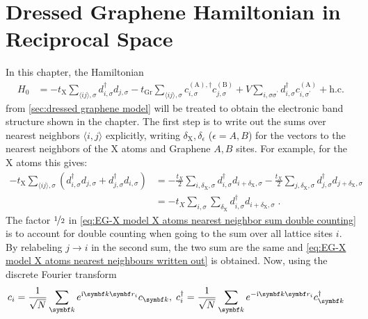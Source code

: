 \documentclass[../main.tex]{subfiles}
\begin{document}
\raggedbottom

\chapter{Dressed Graphene Hamiltonian in Reciprocal Space}\label{ch:dressed graphene reciprocal space}

In this chapter, the Hamiltonian
\begin{align}
	H_0 &= -t_{\mathrm{X}} \sum_{\langle ij \rangle, \sigma} d_{i, \sigma}^{\dagger} d_{j, \sigma}
	-t_{\mathrm{Gr}} \sum_{\langle ij \rangle, \sigma}
	c_{i, \sigma}^{(\mathrm{A}), \dagger} c_{j, \sigma}^{(\mathrm{B})}
	+ V \sum_{i, \sigma \sigma^{\prime}}
	d_{i, \sigma}^{\dagger} c_{i, \sigma^{\prime}}^{(\mathrm{A})} + \mathrm{h.c.}
	\label{eq:EG-X model Hamiltonian non-interacting appendix}
\end{align}
from \cref{sec:dressed graphene model} will be treated to obtain the electronic band structure shown in the chapter.
The first step is to write out the sums over nearest neighbors \(\langle i, j \rangle\) explicitly, writing \(\delta_{\mathrm{X}}, \delta_{\epsilon}\) (\(\epsilon = A, B\)) for the vectors to the nearest neighbors of the \(\mathrm{X}\) atoms and Graphene \(A, B\) sites.
For example, for the \(\mathrm{X}\) atoms this gives:
\begin{align}
	-t_{\mathrm{X}} \sum_{\langle ij \rangle, \sigma} (d_{i, \sigma}^{\dagger} d_{j, \sigma} + d_{j, \sigma}^{\dagger} d_{i, \sigma})
	&= -\frac{t_X}{2} \sum_{i,\delta_{\mathrm{X}},\sigma} d_{i, \sigma}^{\dagger} d_{i + \delta_{\mathrm{X}}, \sigma}
	-\frac{t_X}{2} \sum_{j,\delta_{\mathrm{X}},\sigma} d_{j, \sigma}^{\dagger} d_{j + \delta_{\mathrm{X}}, \sigma} \label{eq:EG-X model X atoms nearest neighbor sum double counting} \\
	&= -t_X \sum_{i,\sigma} \sum_{\delta_{\mathrm{X}}} d_{i, \sigma}^{\dagger} d_{i + \delta_{\mathrm{X}}, \sigma} \;. \label{eq:EG-X model X atoms nearest neighbours written out}
\end{align}
The factor \(\nicefrac{1}{2}\) in \cref{eq:EG-X model X atoms nearest neighbor sum double counting} is to account for double counting when going to the sum over all lattice sites \(i\).
By relabeling \(j \to i\) in the second sum, the two sum are the same and \cref{eq:EG-X model X atoms nearest neighbours written out} is obtained.
Now, using the discrete Fourier transform
\begin{align}
	c_{i} &= \frac{1}{\sqrt{N}} \sum_{\vb{k}} e^{\iu \vb{k} \vb{r}_{i}} c_{\vb{k}} ,\;
	c_{i}^{\dagger} = \frac{1}{\sqrt{N}} \sum_{\vb{k}} e^{-\iu \vb{k} \vb{r}_{i}} c_{\vb{k}}^{\dagger}
\end{align}
\end{document}
